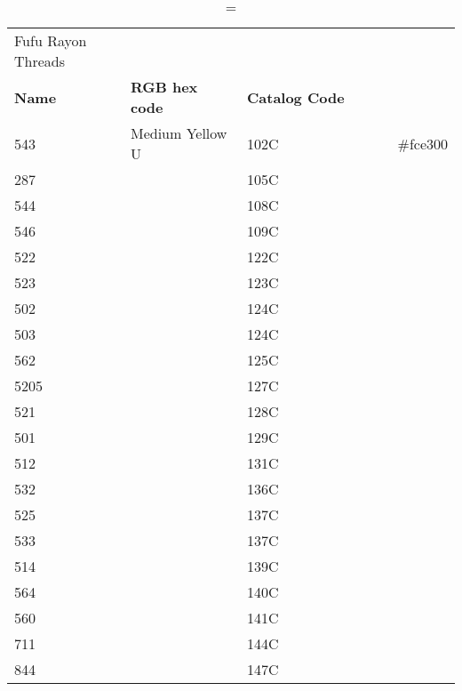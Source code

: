 
\begin{longtable}{p{0.3\linewidth} p{0.3\linewidth} p{0.4\linewidth}}
\caption = {Fufu Rayon Threads}
\label{tblr:fufurayon}\\
\textbf{Name} & \textbf{RGB hex code} & \textbf{Catalog Code} \\
543 & Medium Yellow U & 102C & #fce300\\
287 &  & 105C & \\
544 &  & 108C & \\
546 &  & 109C & \\
522 &  & 122C & \\
523 &  & 123C & \\
502 &  & 124C & \\
503 &  & 124C & \\
562 &  & 125C & \\
5205 &  & 127C & \\
521 &  & 128C & \\
501 &  & 129C & \\
512 &  & 131C & \\
532 &  & 136C & \\
525 &  & 137C & \\
533 &  & 137C & \\
514 &  & 139C & \\
564 &  & 140C & \\
560 &  & 141C & \\
711 &  & 144C & \\
844 &  & 147C & \\

\end{longtable}
